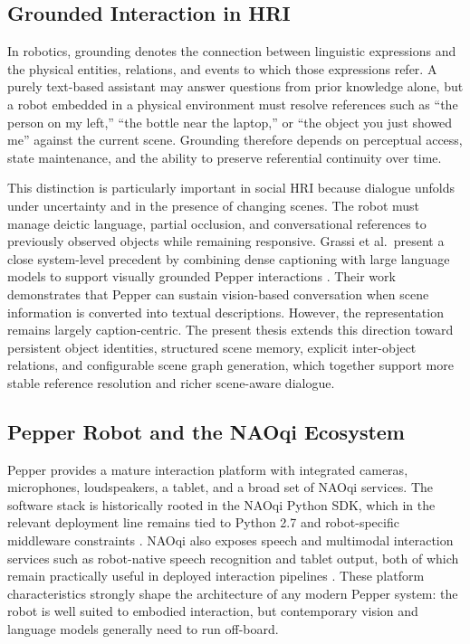 \documentclass[
  digital,     %
  oneside,     %
  nosansbold,  %
  nocolorbold, %
  lof,         %
  lot,         %
]{fithesis4}
\begin{document}
\subsection{Grounded Interaction in HRI}
In robotics, grounding denotes the connection between linguistic expressions and the physical entities, relations, and events to which those expressions refer. A purely text-based assistant may answer questions from prior knowledge alone, but a robot embedded in a physical environment must resolve references such as ``the person on my left,'' ``the bottle near the laptop,'' or ``the object you just showed me'' against the current scene. Grounding therefore depends on perceptual access, state maintenance, and the ability to preserve referential continuity over time.

This distinction is particularly important in social HRI because dialogue unfolds under uncertainty and in the presence of changing scenes. The robot must manage deictic language, partial occlusion, and conversational references to previously observed objects while remaining responsive. Grassi et al.\ present a close system-level precedent by combining dense captioning with large language models to support visually grounded Pepper interactions \cite{grassi_grounding_2024}. Their work demonstrates that Pepper can sustain vision-based conversation when scene information is converted into textual descriptions. However, the representation remains largely caption-centric. The present thesis extends this direction toward persistent object identities, structured scene memory, explicit inter-object relations, and configurable scene graph generation, which together support more stable reference resolution and richer scene-aware dialogue.

\subsection{Pepper Robot and the NAOqi Ecosystem}
Pepper provides a mature interaction platform with integrated cameras, microphones, loudspeakers, a tablet, and a broad set of NAOqi services. The software stack is historically rooted in the NAOqi Python SDK, which in the relevant deployment line remains tied to Python 2.7 and robot-specific middleware constraints \cite{softbank_python_sdk_2026}. NAOqi also exposes speech and multimodal interaction services such as robot-native speech recognition and tablet output, both of which remain practically useful in deployed interaction pipelines \cite{softbank_alspeechrecognition_2026, softbank_peppers_tablet_2026}. These platform characteristics strongly shape the architecture of any modern Pepper system: the robot is well suited to embodied interaction, but contemporary vision and language models generally need to run off-board.
\end{document}
